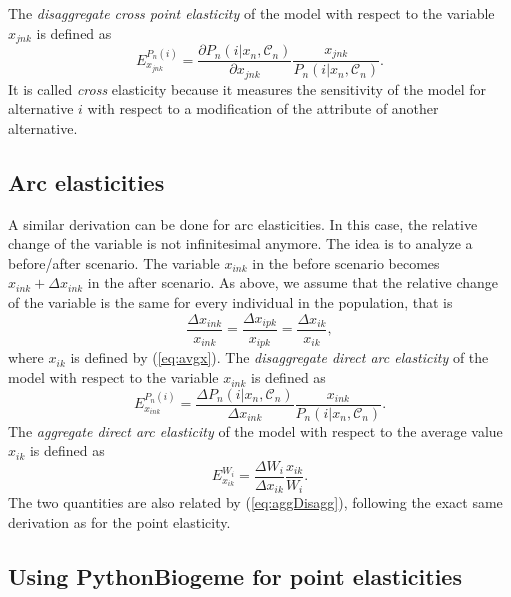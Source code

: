 \documentclass[12pt,a4paper]{article}
\newcommand{\req}[1]{(\ref{#1})}
\newcommand{\C}{\mathcal{C}}
\begin{document}
The \emph{disaggregate cross point elasticity} of the model with respect to
the variable $x_{jnk}$ is defined as
\begin{equation}
\label{eq:disagCrossElasticity}
  E_{x_{jnk}}^{P_n(i)} = \frac{\partial P_n(i|x_n, \C_n)}{\partial
  x_{jnk}} \frac{x_{jnk}}{P_n(i|x_n, \C_n)}.
\end{equation}
It is called \emph{cross} elasticity because it measures the sensitivity
of the model for alternative $i$ with respect to a  modification of
the attribute of another alternative.



\subsection{Arc elasticities}

A similar derivation can be done for arc elasticities. In this case, 
the relative change of the variable is not infinitesimal anymore. The
idea is to analyze a before/after scenario. The variable $x_{ink}$ in
the before scenario becomes $x_{ink} + \Delta x_{ink}$ in the after scenario.
As above,  we assume that the relative change of
the variable is the same for every individual in the population,  that
is
\begin{equation}
  \label{eq:uniformChangeArc}
\frac{\Delta x_{ink}}{x_{ink}} = \frac{\Delta x_{ipk}}{x_{ipk}} = 
\frac{\Delta x_{ik}}{x_{ik}}, 
\end{equation}
where $x_{ik}$ is defined by \req{eq:avgx}.
The \emph{disaggregate direct arc elasticity} of the model with respect to
the variable $x_{ink}$ is defined as
\begin{equation}
\label{eq:disagElasticityArc}
  E_{x_{ink}}^{P_n(i)} = \frac{\Delta P_n(i|x_n, \C_n)}{\Delta
  x_{ink}} \frac{x_{ink}}{P_n(i|x_n, \C_n)}.
\end{equation}
The \emph{aggregate direct arc elasticity} of the model with
respect to the average value $x_{ik}$ is defined as
\begin{equation}
E_{x_{ik}}^{W_i} = \frac{\Delta W_i}{\Delta x_{ik}} \frac{x_{ik}}{W_i}.
\end{equation}
The two quantities are also related by \req{eq:aggDisagg},  following
the exact same derivation as for the point elasticity.

\subsection{Using PythonBiogeme for point elasticities}
\end{document}
